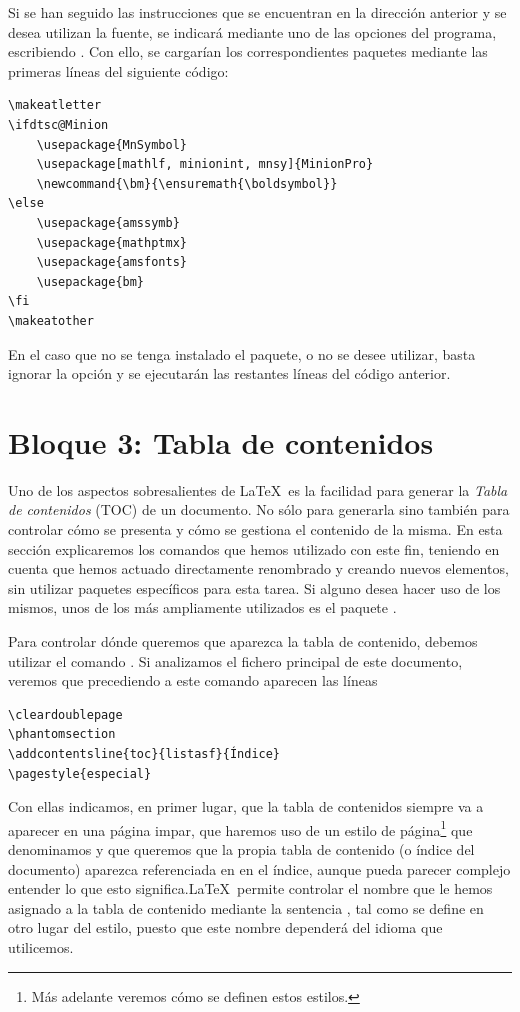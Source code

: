 Si se han seguido las instrucciones que se encuentran en la dirección anterior y se desea utilizan la fuente, se indicará mediante uno de las opciones del programa, escribiendo . Con ello, se cargarían los correspondientes paquetes mediante las primeras líneas del siguiente código:
\begin{lstlisting}[rulecolor=\color{white}]
\makeatletter
\ifdtsc@Minion
	\usepackage{MnSymbol}
	\usepackage[mathlf, minionint, mnsy]{MinionPro}
	\newcommand{\bm}{\ensuremath{\boldsymbol}}
\else
	\usepackage{amssymb}
	\usepackage{mathptmx}
	\usepackage{amsfonts}
	\usepackage{bm}
\fi
\makeatother
\end{lstlisting}

En el caso que no se tenga instalado el paquete, o no se desee utilizar, basta ignorar la opción y se ejecutarán las restantes líneas del código anterior. 

\section{Bloque 3: Tabla de contenidos}
Uno de los aspectos sobresalientes de \LaTeX\ es la facilidad para generar la \emph{Tabla de contenidos} (TOC) de un documento. No sólo para generarla sino también para controlar cómo se presenta y cómo se gestiona el contenido de la misma. En esta sección explicaremos los comandos que hemos utilizado con este fin, teniendo en cuenta que hemos actuado directamente renombrado y creando nuevos elementos, sin utilizar paquetes específicos para esta tarea. Si alguno desea hacer uso de los mismos, unos de los más ampliamente utilizados es el paquete .

Para controlar dónde queremos que aparezca la tabla de contenido, debemos utilizar el comando . Si analizamos el fichero principal de este documento, veremos que precediendo a este comando aparecen las líneas
\begin{lstlisting}[frame=none]
\cleardoublepage
\phantomsection
\addcontentsline{toc}{listasf}{Índice}
\pagestyle{especial}
\end{lstlisting}
Con ellas indicamos, en primer lugar, que la tabla de contenidos siempre va a aparecer en una página impar, que haremos uso de un estilo de página\footnote{Más adelante veremos cómo se definen estos estilos.} que denominamos  y que queremos que la propia tabla de contenido (o índice del documento) aparezca referenciada en en el índice, aunque pueda parecer complejo entender lo que esto significa.\LaTeX\ permite controlar el nombre que le hemos asignado a la tabla de contenido mediante la sentencia , tal como se define en otro lugar del estilo, puesto que este nombre dependerá del idioma que utilicemos.
 
